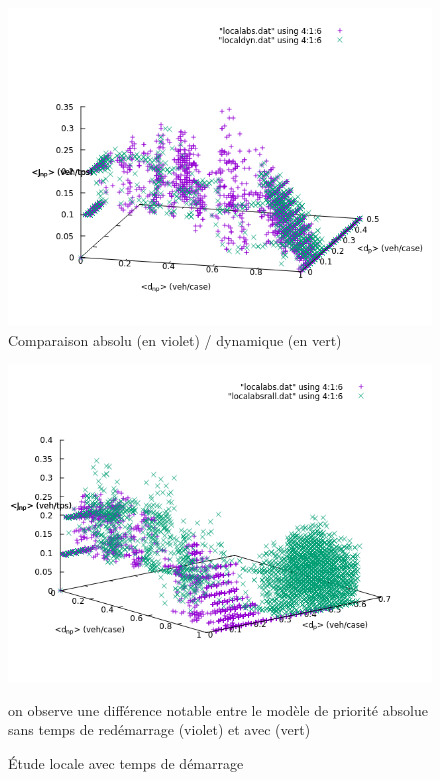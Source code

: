 \documentclass[11pt]{article}
\begin{document}
	
\begin{figure}[h]
	\begin{center}
		\includegraphics[scale=0.4]{./diagrammes-fondamentaux/localabsdyn0w}
	\end{center}
\caption{\label{prres}Comparaison absolu (en violet) / dynamique (en vert)}
\end{figure}	
	
\begin{figure}[h]
	 	\begin{center}
	 		\includegraphics[scale=0.4]{./diagrammes-fondamentaux/localabs0w1w}
	 	\end{center}
	 	\caption{\label{rdem}Étude locale avec temps de démarrage}
	 	on observe une différence notable entre le modèle de priorité absolue sans temps de redémarrage (violet) et avec (vert)
	 \end{figure}
\end{document}
